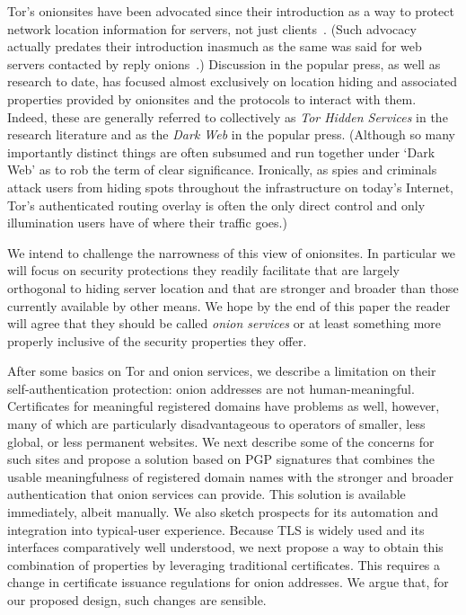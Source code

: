 \documentclass[10pt]{styles/IEEEtran}
\begin{document}
Tor's onionsites have been advocated since their introduction as a way
to protect network location information for servers, not just
clients~\cite{tor-design}. (Such advocacy actually predates their
introduction inasmuch as the same was said for web servers contacted
by reply onions~\cite{onion-routing:cacm99}.)
Discussion in the popular press, as well as research to
date, has focused almost exclusively on location hiding and associated
properties provided by onionsites and the protocols to interact with
them. Indeed, these are generally referred to collectively as
\emph{Tor Hidden Services} in the research literature and as the
\emph{Dark Web} in the popular press. (Although so many importantly
distinct things are often subsumed and run together under `Dark Web'
as to rob the term of clear significance.
Ironically, as spies and criminals attack users from hiding spots
throughout the infrastructure on today's Internet, Tor's
authenticated routing overlay is often the only direct control and
only illumination users have of where their traffic goes.)

We intend to challenge the narrowness of this view of
onionsites. In particular we will focus on security protections they
readily facilitate that are largely orthogonal to hiding server
location and that are stronger and broader than those currently
available by other means. We hope by the end of this paper the reader
will agree that they should be called \emph{onion services} or at
least something more properly inclusive of the security properties
they offer.


After some basics on Tor and onion services, we
describe a limitation on their self-authentication protection: onion
addresses are not human-meaningful. Certificates for meaningful
registered domains have problems as well, however, many of which are
particularly disadvantageous to operators of smaller, less global, or
less permanent websites.  We next describe some of the concerns for
such sites and propose a solution based on PGP signatures that
combines the usable meaningfulness of registered domain names with the
stronger and broader authentication that onion services can
provide.  This solution is available immediately, albeit manually.
We also sketch prospects for its automation and integration
into typical-user experience.
Because TLS is widely used and its interfaces comparatively well
understood, we next propose a way to obtain this
combination of properties by leveraging traditional certificates.
This requires a change in certificate issuance regulations for onion
addresses.  We argue that, for our proposed design, such changes are
sensible.
\end{document}
